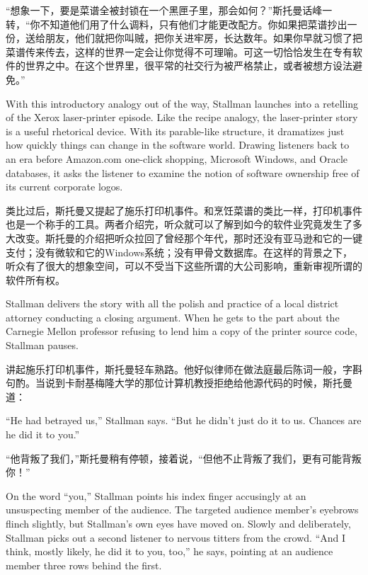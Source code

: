 \ifdefined\chs
``想象一下，要是菜谱全被封锁在一个黑匣子里，那会如何？''斯托曼话峰一转，``你不知道他们用了什么调料，只有他们才能更改配方。你如果把菜谱抄出一份，送给朋友，他们就把你叫贼，把你关进牢房，长达数年。如果你早就习惯了把菜谱传来传去，这样的世界一定会让你觉得不可理喻。可这一切恰恰发生在专有软件的世界之中。在这个世界里，很平常的社交行为被严格禁止，或者被想方设法避免。''
\fi

\ifdefined\eng
With this introductory analogy out of the way, Stallman launches into a retelling of the Xerox laser-printer episode. Like the recipe analogy, the laser-printer story is a useful rhetorical device. With its parable-like structure, it dramatizes just how quickly things can change in the software world. Drawing listeners back to an era before Amazon.com one-click shopping, Microsoft Windows, and Oracle databases, it asks the listener to examine the notion of software ownership free of its current corporate logos.
\fi

\ifdefined\chs
类比过后，斯托曼又提起了施乐打印机事件。和烹饪菜谱的类比一样，打印机事件也是一个称手的工具。两者介绍完，听众就可以了解到如今的软件业究竟发生了多大改变。斯托曼的介绍把听众拉回了曾经那个年代，那时还没有亚马逊和它的一键支付；没有微软和它的Windows系统；没有甲骨文数据库。在这样的背景之下，听众有了很大的想象空间，可以不受当下这些所谓的大公司影响，重新审视所谓的软件所有权。
\fi

\ifdefined\eng
Stallman delivers the story with all the polish and practice of a local district attorney conducting a closing argument. When he gets to the part about the Carnegie Mellon professor refusing to lend him a copy of the printer source code, Stallman pauses.
\fi

\ifdefined\chs
讲起施乐打印机事件，斯托曼轻车熟路。他好似律师在做法庭最后陈词一般，字斟句酌。当说到卡耐基梅隆大学的那位计算机教授拒绝给他源代码的时候，斯托曼道：
\fi

\ifdefined\eng
``He had betrayed us,'' Stallman says. ``But he didn't just do it to us. Chances are he did it to you.''
\fi

\ifdefined\chs
``他背叛了我们，''斯托曼稍有停顿，接着说，``但他不止背叛了我们，更有可能背叛你！''
\fi

\ifdefined\eng
On the word ``you,'' Stallman points his index finger accusingly at an unsuspecting member of the audience. The targeted audience member's eyebrows flinch slightly, but Stallman's own eyes have moved on. Slowly and deliberately, Stallman picks out a second listener to nervous titters from the crowd. ``And I think, mostly likely, he did it to you, too,'' he says, pointing at an audience member three rows behind the first.
\fi

